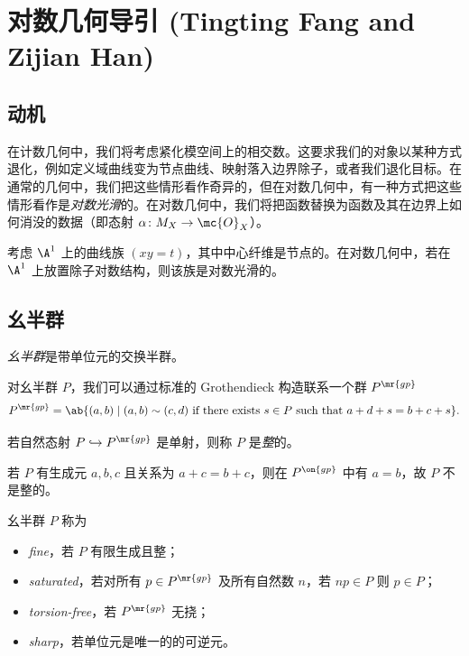 \section{对数几何导引 (Tingting Fang and Zijian Han)}%
\label{sec:Intro to log geometry (Tingting Fang and Zijian Han)}

\subsection{动机}%
\label{sub:Motivation}

在计数几何中，我们将考虑紧化模空间上的相交数。这要求我们的对象以某种方式退化，例如定义域曲线变为节点曲线、映射落入边界除子，或者我们退化目标。在通常的几何中，我们把这些情形看作奇异的，但在对数几何中，有一种方式把这些情形看作是\textit{对数光滑}的。在对数几何中，我们将把函数替换为函数及其在边界上如何消没的数据（即态射 \(\alpha \colon M_X \to \mc{O}_X\)）。

\begin{exm}
    考虑 \(\A^1\) 上的曲线族 \((xy=t)\)，其中中心纤维是节点的。在对数几何中，若在 \(\A^1\) 上放置除子对数结构，则该族是对数光滑的。
\end{exm}

\subsection{幺半群}%
\label{sub:Monoids}

\begin{defn}
    \textit{幺半群}是带单位元的交换半群。
\end{defn}

对幺半群 \(P\)，我们可以通过标准的 Grothendieck 构造联系一个群 \(P^{\mr{gp}}\)
\[ P^{\mr{gp}} = \ab\{(a,b) \mid (a,b) \sim (c,d) \text{ if there exists } s \in P \text{ such that } a+d+s = b+c+s \}. \]
\begin{defn}
若自然态射 \(P \hookrightarrow P^{\mr{gp}}\) 是单射，则称 \(P\) 是\textit{整}的。
\end{defn}

\begin{exm}
    若 \(P\) 有生成元 \(a,b,c\) 且关系为 \(a+c=b+c\)，则在 \(P^{\on{gp}}\) 中有 \(a = b\)，故 \(P\) 不是整的。
\end{exm}

\begin{defn}
    幺半群 \(P\) 称为
    \begin{itemize}
        \item \textit{fine}，若 \(P\) 有限生成且整；
        \item \textit{saturated}，若对所有 \(p \in P^{\mr{gp}}\) 及所有自然数 \(n\)，若 \(np \in P\) 则 \(p \in P\)；
        \item \textit{torsion-free}，若 \(P^{\mr{gp}}\) 无挠；
        \item \textit{sharp}，若单位元是唯一的的可逆元。
    \end{itemize}
\end{defn}

